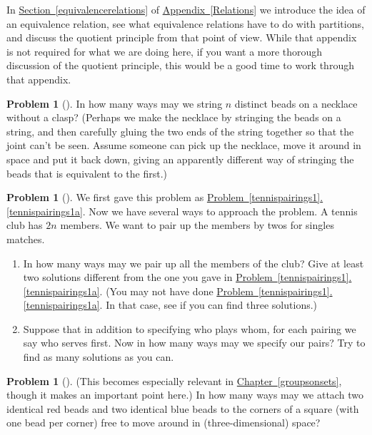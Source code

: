 \documentclass[10pt,]{book}
\theoremstyle{plain}
\theoremstyle{definition}
\newtheorem{activity}[project]{Problem}
\theoremstyle{definition}
\numberwithin{equation}{chapter}
\newcommand{\importantarrow}{\Rightarrow}
\begin{document}
\par
In \hyperref[equivalencerelations]{Section~\ref{equivalencerelations}} of \hyperref[Relations]{Appendix~\ref{Relations}} we introduce the idea of an equivalence relation, see what equivalence relations have to do with partitions, and discuss the quotient principle from that point of view. While that appendix is not required for what we are doing here, if you want a more thorough discussion of the quotient principle, this would be a good time to work through that appendix.%
\begin{activity}[]\marginsymbol[-1em]{} \label{necklace}
In how many ways may we string \(n\) distinct beads on a necklace without a clasp? (Perhaps we make the necklace by stringing the beads on a string, and then carefully gluing the two ends of the string together so that the joint can't be seen. Assume someone can pick up the necklace, move it around in space and put it back down, giving an apparently different way of stringing the beads that is equivalent to the first.)%
\end{activity}
\begin{activity}[]\marginsymbol[-1em]{\pdftooltip{$\importantarrow$}{especially interesting}} \label{tennispairings2}
We first gave this problem as \hyperref[tennispairings1a]{Problem~\ref{tennispairings1}.\ref{tennispairings1a}}. Now we have several ways to approach the problem. A tennis club has \(2n\) members. We want to pair up the members by twos for singles matches.%
\begin{enumerate}[font=\bfseries,label=(\alph*),ref=\alph*]
\item\label{task-45} \marginsymbol[-2.5em]{} In how many ways may we pair up all the members of the club? Give at least two solutions different from the one you gave in   \hyperref[tennispairings1a]{Problem~\ref{tennispairings1}.\ref{tennispairings1a}}. (You may not have done \hyperref[tennispairings1a]{Problem~\ref{tennispairings1}.\ref{tennispairings1a}}. In that case, see if you can find three solutions.)%
\item\label{task-46} \marginsymbol[-2.5em]{} Suppose that in addition to specifying who plays whom, for each pairing we say who serves first.  Now in how many ways may we specify our pairs? Try to find as many solutions as you can.%
\end{enumerate}
\end{activity}
\begin{activity}[] \label{twocolorsofbeads}
(This becomes especially relevant in \hyperref[groupsonsets]{Chapter~\ref{groupsonsets}}, though it makes an important point here.) In how many ways may we attach two identical red beads and two identical blue beads to the corners of a square (with one bead per corner) free to move around in (three-dimensional) space?%
\end{activity}
\end{document}

